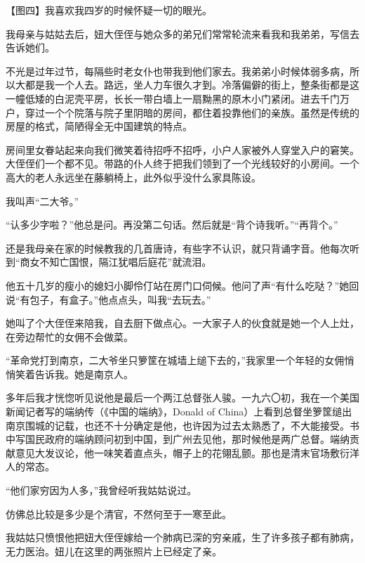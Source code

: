 \clearpage
\par 【图四】我喜欢我四岁的时候怀疑一切的眼光。
\par 我母亲与姑姑去后，妞大侄侄与她众多的弟兄们常常轮流来看我和我弟弟，写信去告诉她们。
\par 不光是过年过节，每隔些时老女仆也带我到他们家去。我弟弟小时候体弱多病，所以大都是我一个人去。路远，坐人力车很久才到。冷落偏僻的街上，整条街都是这一幢低矮的白泥壳平房，长长一带白墙上一扇黝黑的原木小门紧闭。进去千门万户，穿过一个个院落与院子里阴暗的房间，都住着投靠他们的亲族。虽然是传统的房屋的格式，简陋得全无中国建筑的特点。
\par 房间里女眷站起来向我们微笑着待招呼不招呼，小户人家被外人穿堂入户的窘笑。大侄侄们一个都不见。带路的仆人终于把我们领到了一个光线较好的小房间。一个高大的老人永远坐在藤躺椅上，此外似乎没什么家具陈设。
\par 我叫声“二大爷。”
\par “认多少字啦？”他总是问。再没第二句话。然后就是“背个诗我听。”“再背个。”
\par 还是我母亲在家的时候教我的几首唐诗，有些字不认识，就只背诵字音。他每次听到“商女不知亡国恨，隔江犹唱后庭花”就流泪。
\par 他五十几岁的瘦小的媳妇小脚伶仃站在房门口伺候。他问了声“有什么吃哒？”她回说“有包子，有盒子。”他点点头，叫我“去玩去。”
\par 她叫了个大侄侄来陪我，自去厨下做点心。一大家子人的伙食就是她一个人上灶，在旁边帮忙的女佣不会做菜。
\par “革命党打到南京，二大爷坐只箩筐在城墙上缒下去的，”我家里一个年轻的女佣悄悄笑着告诉我。她是南京人。
\par 多年后我才恍惚听见说他是最后一个两江总督张人骏。一九六〇初，我在一个美国新闻记者写的端纳传（《中国的端纳》，Donald of China）上看到总督坐箩筐缒出南京围城的记载，也还不十分确定是他，也许因为过去太熟悉了，不大能接受。书中写国民政府的端纳顾问初到中国，到广州去见他，那时候他是两广总督。端纳贡献意见大发议论，他一味笑着直点头，帽子上的花翎乱颤。那也是清末官场敷衍洋人的常态。
\par “他们家穷因为人多，”我曾经听我姑姑说过。
\par 仿佛总比较是多少是个清官，不然何至于一寒至此。
\par 我姑姑只愤恨他把妞大侄侄嫁给一个肺病已深的穷亲戚，生了许多孩子都有肺病，无力医治。妞儿在这里的两张照片上已经定了亲。
